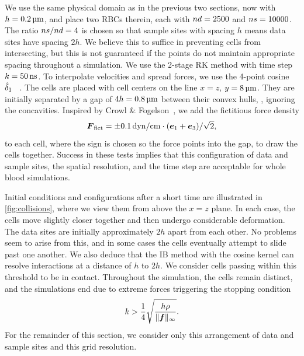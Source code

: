 We use the same physical domain as in the previous two sections, now with $h = 0.2\um$, and place two
RBCs therein, each with $\data\cardinality=2500$ and $\sample\cardinality=10000$. The ratio
$\sample\cardinality/\data\cardinality=4$ is chosen so that sample sites with spacing $h$ means data sites have
spacing $2h$. We believe this to suffice in preventing cells from intersecting, but this is not guaranteed if the
points do not maintain appropriate spacing throughout a simulation. We use the 2-stage RK method with time step
$\timestep = 50\ns$. To interpolate velocities and spread forces, we use the 4-point cosine $\hat{\delta}_1$~%
\cite{Peskin:2002go}. The cells are placed with cell centers on the line $x = z$, $y = 8\um$. They are initially
separated by a gap of $4h = 0.8\um$ between their convex hulls, , ignoring the concavities. Inspired
by Crowl \& Fogelson~\cite{Erickson:2011cf}, we add the fictitious force density
\begin{equation}
    \F_\text{fict} = \pm 0.1\dynpercm\cdot(\e_1+\e_3)/\sqrt{2},
\end{equation}
to each cell, where the sign is chosen so the force points into the gap, to draw the cells together. Success in
these tests implies that this configuration of data and sample sites, the spatial resolution, and the time step
are acceptable for whole blood simulations.

Initial conditions and configurations after a short time are illustrated in \cref{fig:collisions}, where we view
them from above the $x=z$ plane. In each case, the cells move slightly closer together and then undergo
considerable deformation. The data sites are initially approximately $2h$ apart from each other. No problems seem
to arise from this, and in some cases the cells eventually attempt to slide past one another.  We also deduce that
the IB method with the cosine kernel can resolve interactions at a distance of $h$ to $2h$. We consider cells
passing within this threshold to be in contact. Throughout the simulation, the cells remain distinct, and the
simulations end due to extreme forces triggering the stopping condition~\cite{Agresar:1998wv}
\begin{equation}
    k > \frac14\sqrt{\frac{h\rho}{\|\boldsymbol{f}\|_\infty}}.
\end{equation}
For the remainder of this section, we consider only this arrangement of data and sample sites and this grid
resolution.
